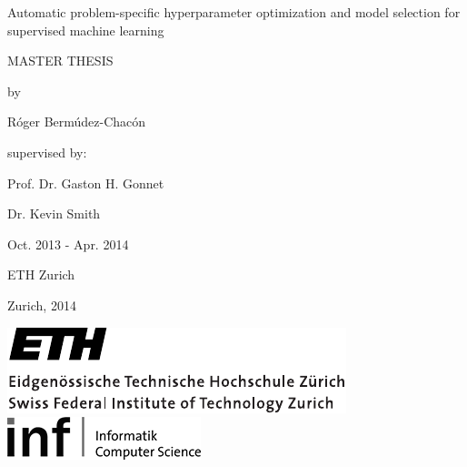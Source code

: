 \begin{titlepage}

\begin{center}
\null
\vfill

\null

{\huge Automatic problem-specific hyperparameter optimization and model selection for supervised machine learning}

\vfill

{}

MASTER THESIS

by

\Large R\'oger Berm\'udez-Chac\'on

\end{center}

\vfill

\begin{adjustwidth}{4.5cm}{0pt}

supervised by:

\hspace{3em} Prof. Dr. Gaston H. Gonnet

\hspace{3em} Dr. Kevin Smith

\null

\hspace{3em} Oct. 2013 - Apr. 2014
\end{adjustwidth}

\vfill
\begin{center}
ETH Zurich

Zurich, 2014
\end{center}

\null

\includegraphics[height=.8cm]{images/eth}
\hfill
\includegraphics[height=.6cm]{images/infk}
\end{titlepage}
